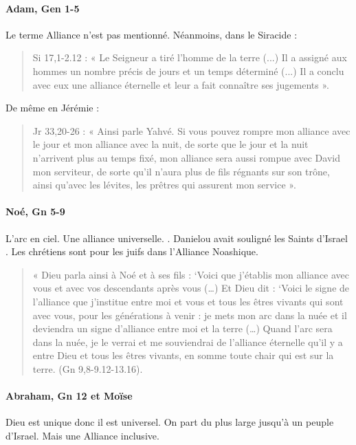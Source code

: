\paragraph{ Adam, Gen 1-5} Le terme Alliance n'est pas mentionné. Néanmoins, dans le Siracide : 
      \begin{quote}
          Si 17,1-2.12 : « Le Seigneur a tiré l’homme de la terre (...) Il a assigné aux hommes un nombre précis de jours et un temps déterminé (...) Il a conclu avec
eux une alliance éternelle et leur a fait connaître ses jugements ».
      \end{quote}
      De même en Jérémie : 
      \begin{quote}
          Jr 33,20-26 : « Ainsi parle Yahvé. Si vous pouvez rompre mon alliance avec le
jour et mon alliance avec la nuit, de sorte que le jour et la nuit n’arrivent plus
au temps fixé, mon alliance sera aussi rompue avec David mon serviteur, de
sorte qu’il n’aura plus de fils régnants sur son trône, ainsi qu’avec les lévites,
les prêtres qui assurent mon service ».
      \end{quote}
     
      
\paragraph{Noé, Gn 5-9} L'arc en ciel. Une alliance universelle. \pageref{Alterite}. Danielou avait souligné les Saints d'Israel . Les chrétiens sont pour les juifs dans l'Alliance Noashique. 
      \begin{quote}
          « Dieu parla ainsi à Noé et à ses fils : `Voici que j'établis mon
alliance avec vous et avec vos descendants après vous (\ldots) Et Dieu
dit : `Voici le signe de l'alliance que j'institue entre moi et vous et
tous les êtres vivants qui sont avec vous, pour les générations à venir
: je mets mon  arc dans la nuée et il deviendra un signe d'alliance entre moi et la
terre (\ldots) Quand l'arc sera dans la nuée, je le verrai et me
souviendrai de l'alliance éternelle qu'il y a entre Dieu et tous les
êtres vivants, en somme toute chair qui est sur la terre. (Gn
9,8-9.12-13.16).
      \end{quote}
     
      
\paragraph{Abraham, Gn 12 et Moïse}
      
  
\begin{Synthesis}
Dieu est unique donc il est universel. On part du plus large jusqu'à un peuple d'Israel. Mais une Alliance inclusive. 
\end{Synthesis}   
    

